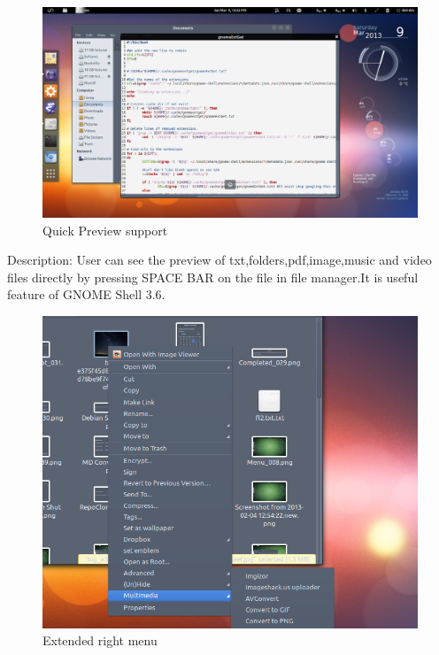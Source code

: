 \begin{figure}[h]
\begin{center}
  \includegraphics[scale=0.35] {8.png}
  \caption[Screenshot - Quick Preview]{Quick Preview support}
\end{center}
\end{figure}
Description: User can see the preview of txt,folders,pdf,image,music and video files directly by pressing SPACE BAR on the file in file manager.It is useful feature of GNOME Shell 3.6.
\newpage
\begin{figure}[h]
\begin{center}
  \includegraphics[scale=0.4] {9.png}
  \caption[Screenshot - Extended Right Menu]{Extended right menu}
\end{center}
\end{figure}
